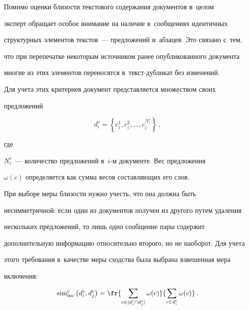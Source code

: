 \vspace*{-2pt}



  Помимо оценки близости текстового содержания документов в~целом

эксперт обращает особое внимание на наличие в~сообщениях идентичных

структурных элементов текстов~--- предложений и~абзацев. Это связано с~тем,

что при перепечатке некоторым источником ранее опубликованного документа

многие из этих элементов переносятся в~текст-дуб\-ли\-кат без изменений.



  Для учета этих критериев документ представляется множеством своих

предложений

$$

d_i^c= \left\{ c_i^1,c_i^2,\ldots ,c_i^{N_i^c}\right\}\,,

$$

 где

$N_i^c$~--- количество предложений в~$i$-м документе. Вес предложения

$\omega(c)$ определяется как сумма весов составляющих его слов.



  При выборе меры близости нужно учесть, что она должна быть

несимметричной: если один из документов получен из другого путем удаления

нескольких предложений, то лишь одно сообщение пары содержит

дополнительную информацию относительно второго, но не наоборот. Для учета

этого требования в~качестве меры сходства была выбрана взвешенная мера

включения:



\vspace*{2pt}



\noindent

  $$

  \mathrm{sim}^c_{\mathrm{inc}} \left( d_i^c,d_j^c\right) = \fr{\sum\limits_{c\in \vert d_i^c\cap

d_j^c\vert}\omega(c)} {\sum\limits_{c\in d_i^c} \omega(c)}\,.

  $$



  \vspace*{-2pt}



